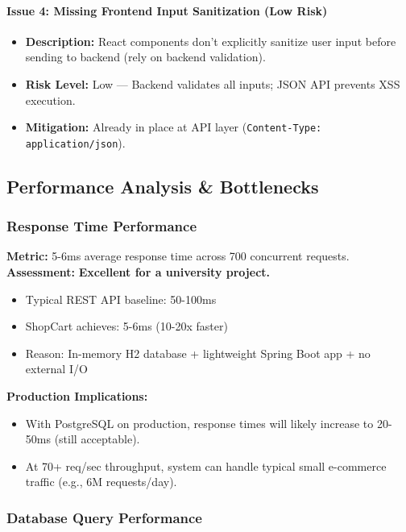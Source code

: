 \documentclass[11pt,a4paper]{article}
\begin{document}
\paragraph{Issue 4: Missing Frontend Input Sanitization (Low Risk)}
\begin{itemize}
    \item \textbf{Description:} React components don't explicitly sanitize user input before sending to backend (rely on backend validation).
    \item \textbf{Risk Level:} Low — Backend validates all inputs; JSON API prevents XSS execution.
    \item \textbf{Mitigation:} Already in place at API layer (\texttt{Content-Type: application/json}).
\end{itemize}

\subsection{Performance Analysis \& Bottlenecks}

\subsubsection{Response Time Performance}

\textbf{Metric:} 5-6ms average response time across 700 concurrent requests.
\textbf{Assessment:} \checkmark \textbf{Excellent for a university project.}

\begin{itemize}
    \item Typical REST API baseline: 50-100ms
    \item ShopCart achieves: 5-6ms (10-20x faster)
    \item Reason: In-memory H2 database + lightweight Spring Boot app + no external I/O
\end{itemize}

\textbf{Production Implications:}
\begin{itemize}
    \item With PostgreSQL on production, response times will likely increase to 20-50ms (still acceptable).
    \item At 70+ req/sec throughput, system can handle typical small e-commerce traffic (e.g., 6M requests/day).
\end{itemize}

\subsubsection{Database Query Performance}
\end{document}
